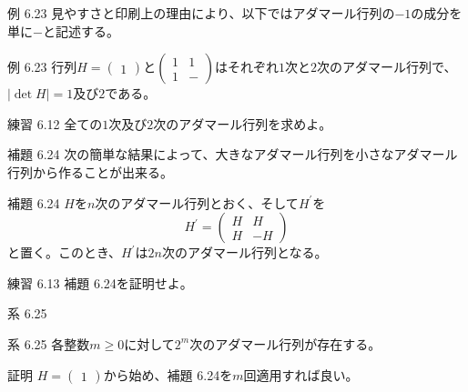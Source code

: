 \documentclass[dvipdfmx,10pt,jsarticle]{beamer}
\begin{document}
  \begin{frame}{例 6.23}
    見やすさと印刷上の理由により、以下ではアダマール行列の$-1$の成分を単に$-$と記述する。

    \begin{block}{例 6.23}
      行列$H = \begin{pmatrix} 1 \end{pmatrix}$と$\begin{pmatrix} 1 & 1 \\ 1 & -\end{pmatrix}$はそれぞれ$1$次と$2$次のアダマール行列で、$\mid \det H \mid = 1$及び$2$である。
    \end{block}
    \vspace{1cm}
    \begin{block}{練習 6.12}
        全ての$1$次及び$2$次のアダマール行列を求めよ。 \\
    \end{block}
  \end{frame}

  \begin{frame}{補題 6.24}
    次の簡単な結果によって、大きなアダマール行列を小さなアダマール行列から作ることが出来る。

    \begin{block}{補題 6.24}
      $H$を$n$次のアダマール行列とおく、そして$H^\prime$を
      \[H^\prime = \begin{pmatrix} H & H \\ H & -H\end{pmatrix}\]
      と置く。このとき、$H^\prime$は$2n$次のアダマール行列となる。
    \end{block}
    \vspace{1cm}
     \begin{block}{練習 6.13}
        補題 6.24を証明せよ。
    \end{block}
  \end{frame}

  \begin{frame}{系 6.25}
    \begin{block}{系 6.25}
      各整数$m \geq 0$に対して$2^m$次のアダマール行列が存在する。
    \end{block}
    \vspace{1cm}
      
    \begin{block}{証明}
        $H = \begin{pmatrix}  1\end{pmatrix}$から始め、補題 6.24を$m$回適用すれば良い。
    \end{block}
  \end{frame}
\end{document}
